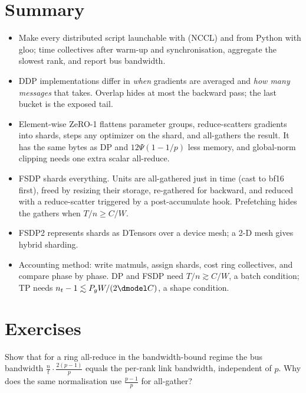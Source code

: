 \section{Summary}\label{sec:sharding:summary}

\begin{itemize}
  \item Make every distributed script launchable with  (NCCL) and from Python with
    gloo; time collectives after warm-up and synchronisation, aggregate the slowest rank, and report
    bus bandwidth.
  \item DDP implementations differ in \emph{when} gradients are averaged and \emph{how many
    messages} that takes. Overlap hides at most the backward pass; the last bucket is the exposed
    tail.
  \item Element-wise ZeRO-1 flattens parameter groups, reduce-scatters gradients into shards,
    steps any optimizer on the shard, and all-gathers the result. It has the same bytes as DP and $12\Psi(1-1/p)$
    less memory, and global-norm clipping needs one extra scalar all-reduce.
  \item FSDP shards everything. Units are all-gathered just in time (cast to bf16 first), freed by
    resizing their storage, re-gathered for backward, and reduced with a reduce-scatter triggered by a
    post-accumulate hook. Prefetching hides the gathers when $T/n \ge C/W$.
  \item FSDP2 represents shards as DTensors over a device mesh; a 2-D mesh gives hybrid sharding.
  \item Accounting method: write matmuls, assign shards, cost ring collectives, and compare phase
    by phase. DP and FSDP need $T/n \gtrsim C/W$, a batch condition; TP needs
    $n_t - 1\lesssim P_g W/(2\dmodel C)$, a shape condition.
\end{itemize}

\section{Exercises}\label{sec:sharding:exercises}

\begin{exercise}
Show that for a ring all-reduce in the bandwidth-bound regime the bus bandwidth
$\frac{n}{t}\cdot\frac{2(p-1)}{p}$ equals the per-rank link bandwidth, independent of $p$.
Why does the same normalisation use $\frac{p-1}{p}$ for all-gather?
\end{exercise}

